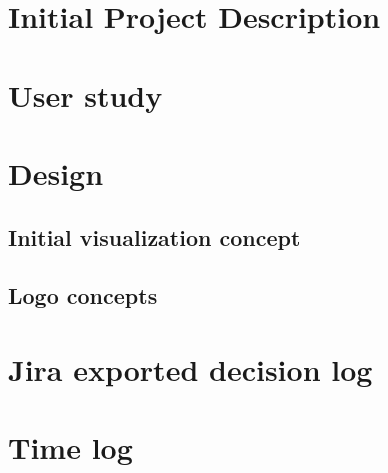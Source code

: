 \documentclass[BPROG,english,oneside]{ntnuthesis/ntnubachelorthesis}
\begin{document}

\makefrontpages %




\tableofcontents
\listoffigures
\listoftables
\lstlistoflistings
\printglossaries


















\appendix %
\chapter{Initial Project Description}   \label{appendix:initialProjectDescription}



%
\chapter{User study}
\label{app:userStudies}










\chapter{Design}
\section{Initial visualization concept}
 \label{app:initialConcept}
\section{Logo concepts}

\chapter{Jira exported decision log}    \label{appendix:decisionLog}


\chapter{Time log}
\label{app:timelog}
%
\end{document}
